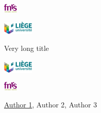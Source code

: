 \documentclass[t,aspectratio=\currentAspect]{beamer}
\begin{document}


\beamertemplatenavigationsymbolsempty
\begin{frame}

\vspace{10pt}

\begin{mybox}
\begin{center}
\parbox{.06\textwidth}{\includegraphics[height=12pt]{logos/FNRS.eps}}
\parbox{.13\textwidth}{\includegraphics[height=18pt]{logos/uLIEGE.eps}}
\parbox{.54\textwidth}{\centering \scriptsize Very long title}
\parbox{.13\textwidth}{\includegraphics[height=18pt]{logos/uLIEGE.eps}}
\parbox{.06\textwidth}{\includegraphics[height=12pt]{logos/FNRS.eps}}
{ \tiny \underline{Author 1}, Author 2, Author 3}
\end{center}
\end{mybox}


\end{frame}
\end{document}
